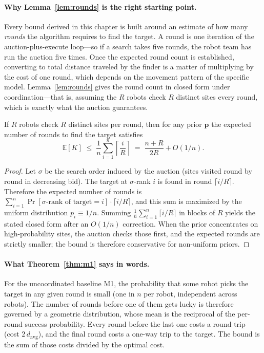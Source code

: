 \begin{doublespacing}
\paragraph{Why Lemma~\ref{lem:rounds} is the right starting point.}
Every bound derived in this chapter is built around an estimate of
how many \emph{rounds} the algorithm requires to find the target. A
round is one iteration of the auction-plus-execute loop---so if a
search takes five rounds, the robot team has run the auction five
times. Once the expected round count is established, converting to
total distance traveled by the finder is a matter of multiplying
by the cost of one round, which depends on the movement pattern of
the specific model. Lemma~\ref{lem:rounds}
gives the round count in closed form under coordination---that is,
assuming the $R$ robots check $R$ distinct sites every round, which
is exactly what the auction guarantees.

\begin{lemma}\label{lem:rounds}
If $R$ robots check $R$ distinct sites per round, then for any prior
$\mathbf{p}$ the expected number of rounds to find the target
satisfies
\[
  \mathbb{E}[K] \;\leq\; \frac{1}{n}\sum_{i=1}^{n}\left\lceil \frac{i}{R} \right\rceil \;=\; \frac{n + R}{2R} + O(1/n).
\]
\end{lemma}

\begin{proof}
Let $\sigma$ be the search order induced by the auction (sites visited
round by round in decreasing bid). The target at $\sigma$-rank $i$ is
found in round $\lceil i/R \rceil$. Therefore the expected number of
rounds is $\sum_{i=1}^n \Pr[\sigma\text{-rank of target} = i] \cdot
\lceil i/R \rceil$, and this sum is maximized by the uniform
distribution $p_i \equiv 1/n$. Summing
$\frac{1}{n}\sum_{i=1}^n \lceil i/R \rceil$ in blocks of $R$ yields
the stated closed form after an $O(1/n)$ correction. When the prior
concentrates on high-probability sites, the auction checks those
first, and the expected rounds are strictly smaller; the bound is
therefore conservative for non-uniform priors.
\end{proof}

\paragraph{What Theorem~\ref{thm:m1} says in words.} For the
uncoordinated baseline M1, the probability that some robot picks the
target in any given round is small (one in $n$ per robot,
independent across robots). The number of rounds before one of them
gets lucky is therefore governed by a geometric distribution, whose
mean is the reciprocal of the per-round success probability. Every
round before the last one costs a round trip (cost $2\,d_\mathrm{avg}$),
and the final round costs a one-way trip to the target. The bound
is the sum of those costs divided by the optimal cost.


\end{doublespacing}
